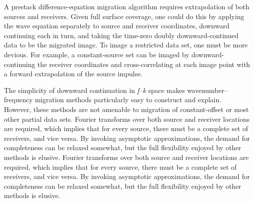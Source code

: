 \begin{problems}
A prestack difference-equation migration algorithm requires extrapolation of both sources and receivers. Given full surface coverage, one could
do this by applying the wave equation separately to source and receiver coordinates, downward continuing each in turn, and taking the time-zero doubly
downward-continued data to be the migrated image. To image a restricted data set, one must be more devious. For example, a constant-source
set can be imaged by downward-continuing the receiver coordinates and cross-correlating at each image point with a forward extrapolation of the source
impulse.
\end{problems}

The simplicity of downward continuation in \textit{f--k} space makes wavenumber--frequency migration methods particularly easy to construct and explain.
However, these methods are not amenable to migration of constant-offset or most other partial data sets. Fourier transforms over both source
and receiver locations are required, which implies that for every source, there must be a complete set of receivers, and vice versa. By invoking
asymptotic approximations, the demand for completeness can be relaxed somewhat, but the full flexibility enjoyed by other methods is elusive. Fourier transforms over both source
and receiver locations are required, which implies that for every source, there must be a complete set of receivers, and vice versa. By invoking
asymptotic approximations, the demand for completeness can be relaxed somewhat, but the full flexibility enjoyed by other methods is elusive.

